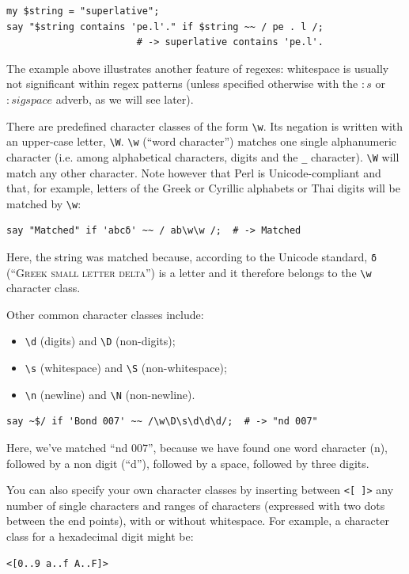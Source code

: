 \begin{verbatim}
my $string = "superlative";
say "$string contains 'pe.l'." if $string ~~ / pe . l /;
                       # -> superlative contains 'pe.l'.
\end{verbatim}
%

The example above illustrates another feature of regexes: 
whitespace is usually not significant within regex patterns 
(unless specified otherwise with the $:s$ or $:sigspace$ 
adverb, as we will see later).

There are predefined character classes of the form \verb'\w'. 
Its negation is written with an upper-case letter, \verb'\W'. 
\verb'\w' (``word character'') 
matches one single alphanumeric character (i.e. among alphabetical 
characters, digits and the \verb'_' character). \verb'\W' will match 
any other character. Note however that Perl is Unicode-compliant 
and that, for example, letters of the Greek or Cyrillic alphabets or 
Thai digits will be matched by \verb'\w':

\begin{verbatim}
say "Matched" if 'abcδ' ~~ / ab\w\w /;  # -> Matched
\end{verbatim}
%

Here, the string was matched because, according to the 
Unicode standard, \verb'δ' (``\textsc{Greek small letter 
delta}'') is a letter and it therefore belongs to 
the \verb'\w' character class.

Other common character classes include:
\begin{itemize}
\item \verb'\d' (digits) and \verb'\D' (non-digits);
\item \verb'\s' (whitespace) and \verb'\S' (non-whitespace);
\item \verb'\n' (newline) and \verb'\N' (non-newline).
\end{itemize}

\begin{verbatim}
say ~$/ if 'Bond 007' ~~ /\w\D\s\d\d\d/;  # -> "nd 007"
\end{verbatim}
%

Here, we've matched ``nd 007'', because we have found one 
word character (n), followed by a non digit (``d''), followed 
by a space, followed by three digits.

You can also specify your own character classes by inserting 
between \verb'<[ ]>' any number of single characters and 
ranges of characters (expressed with two dots between the 
end points), with or without whitespace. For example, a 
character class for a hexadecimal digit might be:
\begin{verbatim}
<[0..9 a..f A..F]>
\end{verbatim}

